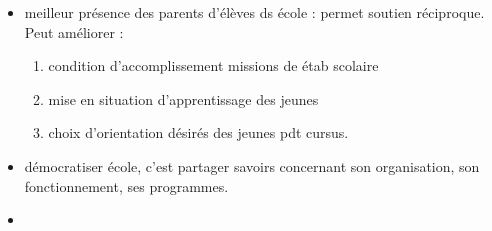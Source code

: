 \documentclass[12pt]{article}
\begin{document}
\begin{itemize}
\item meilleur présence des parents d'élèves ds école : permet soutien réciproque. Peut améliorer : 
\begin{enumerate}
\item condition d'accomplissement missions de étab scolaire \\
\item mise en situation d'apprentissage des jeunes \\
\item choix d'orientation désirés des jeunes pdt cursus. \\
\end{enumerate}

\item démocratiser école, c'est partager savoirs concernant son organisation, son fonctionnement, ses programmes.\\

\item 

\end{itemize}
\end{document}
